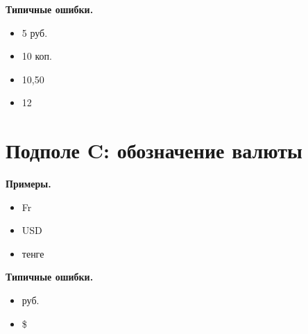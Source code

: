 \textbf{Типичные ошибки.}

\begin{itemize}
    \item 5 руб.
    \item 10 коп.
    \item 10,50
    \item 12
\end{itemize}

\section{Подполе C: обозначение валюты}

\textbf{Примеры.}

\begin{itemize}
    \item Fr
    \item USD
    \item тенге
\end{itemize}

\textbf{Типичные ошибки.}

\begin{itemize}
    \item руб.
    \item \$
\end{itemize}
